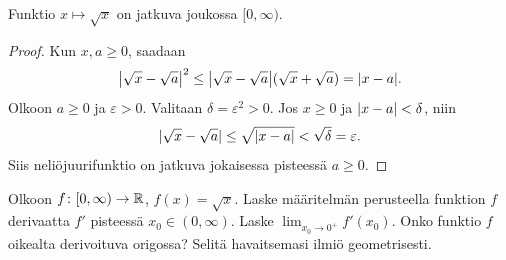 \documentclass[11pt,a4paper]{amsart}
\begin{document}
\begin{lemma}
  \label{lem:sqrt-continuity}
  Funktio \(x \mapsto \sqrt{x}\) on jatkuva joukossa \([0, \infty)\).
\end{lemma}

\begin{proof}
  Kun \(x, a \geq 0\), saadaan
  \[
    \abs*{\sqrt{x} - \sqrt{a}}^2
    \leq \abs*{\sqrt{x} - \sqrt{a}}(\sqrt{x} + \sqrt{a})
    = \abs{x - a}.
  \]
  Olkoon \(a \geq 0\) ja \(\varepsilon > 0\). Valitaan
  \(\delta = \varepsilon^2 > 0\). Jos \(x \geq 0\) ja
  \(\lvert x - a\rvert < \delta\), niin
  \[
    \lvert\sqrt{x} - \sqrt{a}\rvert
    \leq \sqrt{\lvert x - a\rvert} < \sqrt{\delta} = \varepsilon.
  \]
  Siis neliöjuurifunktio on jatkuva jokaisessa pisteessä \(a \geq 0\).
\end{proof}

\begin{exercise}
  Olkoon \(f \colon [0, \infty) \to \mathbb{R}\),
  \(f(x) = \sqrt{x}\). Laske määritelmän perusteella funktion \(f\)
  derivaatta \(f'\) pisteessä \(x_0 \in (0, \infty)\). Laske
  \(\lim_{x_0 \to 0^+} f'(x_0)\). Onko funktio \(f\) oikealta
  derivoituva origossa? Selitä havaitsemasi ilmiö geometrisesti.
\end{exercise}
\end{document}
